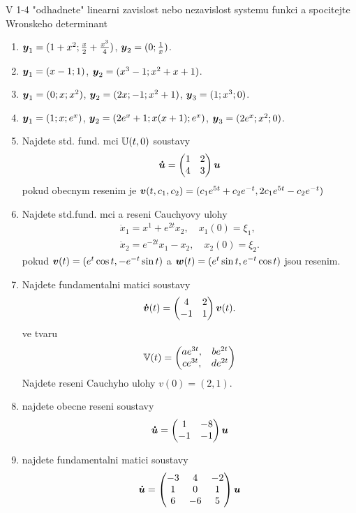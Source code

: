 %
 V 1-4 "odhadnete" linearni zavislost nebo nezavislost systemu funkci a spocitejte
 Wronskeho determinant
\begin{enumerate}
 \item
 $\mathbf{\boldsymbol{y}}_1=(1+x^2;\frac{x}{2}+\frac{x^3}{4})$, $\mathbf{\boldsymbol{y}}_2=(0;\frac{1}{x})$.
 \item
 $\mathbf{\boldsymbol{y}}_1=(x-1;1)$, $\mathbf{\boldsymbol{y}}_2=(x^3-1;x^2+x+1)$.
 \item
 $\mathbf{\boldsymbol{y}}_1=(0;x;x^2)$, $\mathbf{\boldsymbol{y}}_2=(2x;-1;x^2+1)$, $\mathbf{\boldsymbol{y}}_3=(1;x^3;0)$.
 \item
 $\mathbf{\boldsymbol{y}}_1=(1;x;e^x)$, $\mathbf{\boldsymbol{y}}_2=(2e^x+1;x(x+1);e^x)$, $\mathbf{\boldsymbol{y}}_3=(2e^x;x^2;0)$.
 \item Najdete std. fund. mci ${\mathbb{U}}(t,0)$ soustavy
 \[
   \mathbf{\boldsymbol{\dot{u}}}=
   \left(\begin{matrix}
     1&2\\4&3
   \end{matrix}\right)
   \mathbf{\boldsymbol{u}}
 \]
pokud obecnym resenim je 
$ \mathbf{\boldsymbol{v}}(t,c_1,c_2)=(c_1 e^{5t}+c_2 e^{-t}, 2c_1e^{5t}-c_2 e^{-t})$

\item
Najdete std.fund. mci a reseni Cauchyovy ulohy
  \begin{align}
    \dot{x}_1=x^1+e^{2t}x_2,\quad x_1(0)=\xi_1,\\
    \dot{x}_2=e^{-2t}x_1-x_2,\quad x_2(0)=\xi_2.
  \end{align}
pokud $\mathbf{\boldsymbol{v}}(t)=(e^t\cos t,-e^{-t}\sin t)$ a $\mathbf{\boldsymbol{w}}(t)=(e^t\sin t,e^{-t}\cos t)$ jsou resenim.

\item
Najdete fundamentalni matici soustavy
\[
  \mathbf{\boldsymbol{\dot{v}}}(t)=\left(\begin{matrix}
          4&2\\-1&1
        \end{matrix}\right)\mathbf{\boldsymbol{v}}(t).
\]
ve tvaru 
\[
 {\mathbb{V}}(t)=\left(\begin{matrix}
ae^{3t},& be^{2t}\\
ce^{3t},& de^{2t}
           \end{matrix}\right)
\]
Najdete reseni Cauchyho ulohy $v(0)=(2,1)$.
\item
najdete obecne reseni soustavy
\[
  \mathbf{\boldsymbol{\dot{u}}}=\left(\begin{matrix}1&-8\\-1&-1\end{matrix}\right)\mathbf{\boldsymbol{u}}
\]
\item
najdete fundamentalni matici soustavy
\[
  \mathbf{\boldsymbol{\dot{u}}}=\left(\begin{matrix}-3&4&-2\\1&0&1\\6&-6&5\end{matrix}\right)\mathbf{\boldsymbol{u}}
\]

\end{enumerate}
